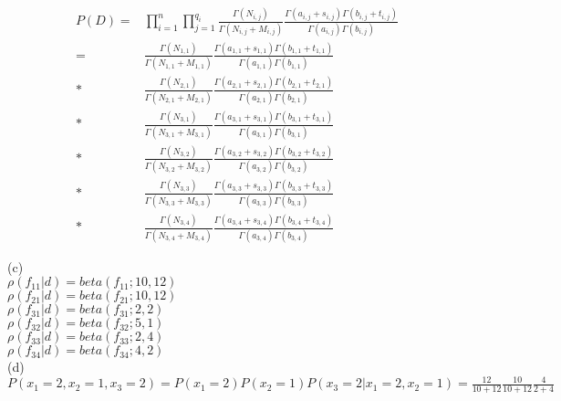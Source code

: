 \documentclass[a4paper]{article}
\begin{document}
\begin{align}
P(D)=&\prod\limits_{i=1}^{n} \prod\limits_{j=1}^{q_i}\frac{\Gamma(N_{i,j})}{\Gamma(N_{i,j} + M_{i,j})} \frac{\Gamma(a_{i,j}+s_{i,j})\Gamma(b_{i,j}+t_{i,j})}{\Gamma(a_{i,j})\Gamma(b_{i,j})}\\
=&\frac{\Gamma(N_{1,1})}{\Gamma(N_{1,1} + M_{1,1})} \frac{\Gamma(a_{1,1}+s_{1,1})\Gamma(b_{1,1}+t_{1,1})}{\Gamma(a_{1,1})\Gamma(b_{1,1})}\\
*&\frac{\Gamma(N_{2,1})}{\Gamma(N_{2,1} + M_{2,1})} \frac{\Gamma(a_{2,1}+s_{2,1})\Gamma(b_{2,1}+t_{2,1})}{\Gamma(a_{2,1})\Gamma(b_{2,1})}\\
*&\frac{\Gamma(N_{3,1})}{\Gamma(N_{3,1} + M_{3,1})} \frac{\Gamma(a_{3,1}+s_{3,1})\Gamma(b_{3,1}+t_{3,1})}{\Gamma(a_{3,1})\Gamma(b_{3,1})}\\
*&\frac{\Gamma(N_{3,2})}{\Gamma(N_{3,2} + M_{3,2})} \frac{\Gamma(a_{3,2}+s_{3,2})\Gamma(b_{3,2}+t_{3,2})}{\Gamma(a_{3,2})\Gamma(b_{3,2})}\\
*&\frac{\Gamma(N_{3,3})}{\Gamma(N_{3,3} + M_{3,3})} \frac{\Gamma(a_{3,3}+s_{3,3})\Gamma(b_{3,3}+t_{3,3})}{\Gamma(a_{3,3})\Gamma(b_{3,3})}\\
*&\frac{\Gamma(N_{3,4})}{\Gamma(N_{3,4} + M_{3,4})} \frac{\Gamma(a_{3,4}+s_{3,4})\Gamma(b_{3,4}+t_{3,4})}{\Gamma(a_{3,4})\Gamma(b_{3,4})}
\end{align}

(c)\\
$\rho(f_{11}|d)=beta(f_{11}; 10, 12)$\\
$\rho(f_{21}|d)=beta(f_{21}; 10, 12)$\\
$\rho(f_{31}|d)=beta(f_{31}; 2, 2)$\\
$\rho(f_{32}|d)=beta(f_{32}; 5, 1)$\\
$\rho(f_{33}|d)=beta(f_{33}; 2, 4)$\\
$\rho(f_{34}|d)=beta(f_{34}; 4, 2)$\\

(d)\\
$P(x_1=2,x_2=1,x_3=2)=P(x_1=2)P(x_2=1)P(x_3=2|x_1=2,x_2=1)=\frac{12}{10+12} \frac{10}{10+12} \frac{4}{2+4}$
\end{document}
